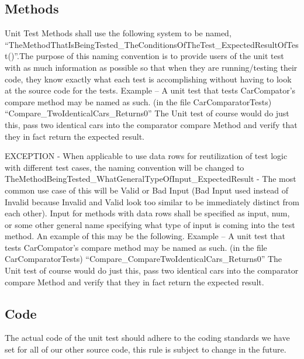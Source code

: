 \documentclass{article}
\begin{document}
\subsection{Methods}
Unit Test Methods shall use the following system to be named, \enquote{TheMethodThatIsBeingTested\_TheConditionsOfTheTest\_ExpectedResultOfTest()}.The purpose of this naming convention is to provide users of the unit test with as much information as possible so that when they are running/testing their code, they know exactly what each test is accomplishing without having to look at the source code for the tests. Example – A unit test that tests CarCompator’s compare method may be named as such. (in the file CarComparatorTests) \enquote{Compare\_TwoIdenticalCars\_Returns0} The Unit test of course would do just this, pass two identical cars into the comparator compare Method and verify that they in fact return the expected result.
\newline 
\newline

EXCEPTION - When applicable to use data rows for reutilization of test logic with different test cases, the naming convention will be changed to TheMethodBeingTested\_WhatGeneralTypeOfInput\_ExpectedResult - The most common use case of this will be Valid or Bad Input (Bad Input used instead of Invalid because Invalid and Valid look too similar to be immediately distinct from each other). Input for methods with data
rows shall be specified as input, num, or some other general name specifying what type of input is coming into the test method. An example of this may be the following.
Example – A unit test that tests CarCompator’s compare method may be named as such. (in the file CarComparatorTests)
\newline
\enquote{Compare\_CompareTwoIdenticalCars\_Returns0}
\newline
The Unit test of course would do just this, pass two identical cars into the comparator compare Method and verify that they in fact return the expected result.
\newline
\subsection{Code}
The actual code of the unit test should adhere to the coding standards we have set for all of our other source code, this rule is subject to change in the future.
\end{document}
